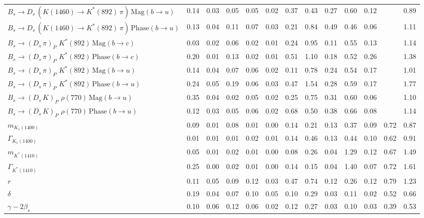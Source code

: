 \begin{tabular}{l  c  c  c  c  c  c  c  c  c  c  c  | c }
$B_s \to D_s \, ( K(1460) \to K^{*}(892) \, \pi ) \, \text{Mag} (b \to u)$ & 0.14 & 0.03 & 0.05 & 0.05 & 0.02 & 0.37 & 0.43 & 0.27 & 0.60 & 0.12 &  & 0.89 \\ 
$B_s \to D_s \, ( K(1460) \to K^{*}(892) \, \pi ) \, \text{Phase} (b \to u)$ & 0.13 & 0.04 & 0.11 & 0.07 & 0.03 & 0.21 & 0.84 & 0.49 & 0.46 & 0.06 &  & 1.11 \\ 
$B_s \to ( D_s \, \pi)_{P} \, \, K^{*}(892) \, \text{Mag} (b \to c)$ & 0.03 & 0.02 & 0.06 & 0.02 & 0.01 & 0.24 & 0.95 & 0.11 & 0.55 & 0.13 &  & 1.14 \\ 
$B_s \to ( D_s \, \pi)_{P} \, \, K^{*}(892) \, \text{Phase} (b \to c)$ & 0.20 & 0.01 & 0.13 & 0.02 & 0.01 & 0.51 & 1.10 & 0.18 & 0.52 & 0.26 &  & 1.38 \\ 
$B_s \to ( D_s \, \pi)_{P} \, \, K^{*}(892) \, \text{Mag} (b \to u)$ & 0.14 & 0.04 & 0.07 & 0.06 & 0.02 & 0.11 & 0.78 & 0.24 & 0.54 & 0.17 &  & 1.01 \\ 
$B_s \to ( D_s \, \pi)_{P} \, \, K^{*}(892) \, \text{Phase} (b \to u)$ & 0.24 & 0.05 & 0.19 & 0.06 & 0.03 & 0.47 & 1.54 & 0.28 & 0.59 & 0.17 &  & 1.77 \\ 
$B_s \to ( D_s \, K)_{P} \, \, \rho(770) \, \text{Mag} (b \to u)$ & 0.35 & 0.04 & 0.02 & 0.05 & 0.02 & 0.25 & 0.75 & 0.31 & 0.60 & 0.06 &  & 1.10 \\ 
$B_s \to ( D_s \, K)_{P} \, \, \rho(770) \, \text{Phase} (b \to u)$ & 0.12 & 0.03 & 0.05 & 0.06 & 0.02 & 0.68 & 0.50 & 0.38 & 0.66 & 0.08 &  & 1.14 \\ 
$m_{K_1(1400)} $ & 0.09 & 0.01 & 0.08 & 0.01 & 0.00 & 0.14 & 0.21 & 0.13 & 0.37 & 0.09 & 0.72 & 0.87 \\ 
$\Gamma_{K_1(1400)}$ & 0.01 & 0.01 & 0.01 & 0.02 & 0.01 & 0.14 & 0.46 & 0.13 & 0.44 & 0.10 & 0.62 & 0.91 \\ 
$m_{K^{*}(1410)}$ & 0.05 & 0.01 & 0.02 & 0.01 & 0.00 & 0.08 & 0.26 & 0.04 & 1.29 & 0.12 & 0.67 & 1.49 \\ 
$\Gamma_{K^{*}(1410)}$ & 0.25 & 0.00 & 0.02 & 0.01 & 0.00 & 0.14 & 0.15 & 0.04 & 1.40 & 0.07 & 0.72 & 1.61 \\ 
$r$ & 0.11 & 0.05 & 0.09 & 0.12 & 0.03 & 0.47 & 0.74 & 0.12 & 0.26 & 0.12 & 0.79 & 1.23 \\ 
$\delta$ & 0.19 & 0.04 & 0.07 & 0.10 & 0.05 & 0.10 & 0.29 & 0.03 & 0.11 & 0.02 & 0.52 & 0.66 \\ 
$\gamma - 2 \beta_{s}$ & 0.10 & 0.06 & 0.12 & 0.06 & 0.02 & 0.12 & 0.27 & 0.03 & 0.10 & 0.03 & 0.39 & 0.53 \\ 
\hline
\hline
\end{tabular}
